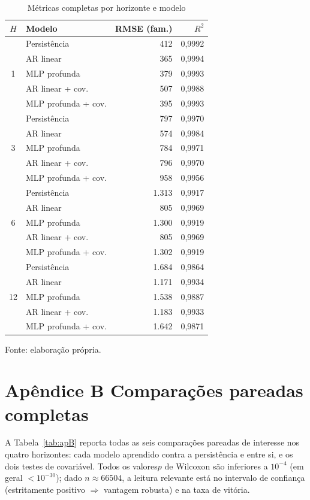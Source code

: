 \documentclass[12pt,a4paper,oneside]{article}
\begin{document}
\begin{table}[H]
\centering
\caption{Métricas completas por horizonte e modelo}
\label{tab:apA}
\small
\begin{tabular}{@{}clrr@{}}
\toprule
\textbf{$H$} & \textbf{Modelo} & \textbf{RMSE (fam.)} & \textbf{$R^2$} \\
\midrule
\multirow{5}{*}{1}
 & Persistência & 412 & 0,9992 \\
 & AR linear & 365 & 0,9994 \\
 & MLP profunda & 379 & 0,9993 \\
 & AR linear + cov. & 507 & 0,9988 \\
 & MLP profunda + cov. & 395 & 0,9993 \\
\midrule
\multirow{5}{*}{3}
 & Persistência & 797 & 0,9970 \\
 & AR linear & 574 & 0,9984 \\
 & MLP profunda & 784 & 0,9971 \\
 & AR linear + cov. & 796 & 0,9970 \\
 & MLP profunda + cov. & 958 & 0,9956 \\
\midrule
\multirow{5}{*}{6}
 & Persistência & 1.313 & 0,9917 \\
 & AR linear & 805 & 0,9969 \\
 & MLP profunda & 1.300 & 0,9919 \\
 & AR linear + cov. & 805 & 0,9969 \\
 & MLP profunda + cov. & 1.302 & 0,9919 \\
\midrule
\multirow{5}{*}{12}
 & Persistência & 1.684 & 0,9864 \\
 & AR linear & 1.171 & 0,9934 \\
 & MLP profunda & 1.538 & 0,9887 \\
 & AR linear + cov. & 1.183 & 0,9933 \\
 & MLP profunda + cov. & 1.642 & 0,9871 \\
\bottomrule
\end{tabular}
\par\smallskip
{\footnotesize Fonte: elaboração própria.}
\end{table}

\newpage
\section*{Apêndice B \textendash{} Comparações pareadas completas}

A Tabela~\ref{tab:apB} reporta todas as seis comparações pareadas de
interesse nos quatro horizontes: cada modelo aprendido contra a
persistência e entre si, e os dois testes de covariável. Todos os
valores\-$p$ de Wilcoxon são inferiores a $10^{-4}$ (em geral
$<10^{-30}$); dado $n\approx\num{66504}$, a leitura relevante está no
intervalo de confiança (estritamente positivo $\Rightarrow$ vantagem
robusta) e na taxa de vitória.
\end{document}
